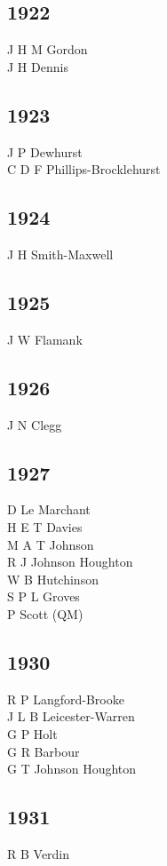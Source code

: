 \begin{multicols}{3}
  \subsection*{1922}
  J H M Gordon \\
  J H Dennis \\
  \subsection*{1923}
  J P Dewhurst \\
  C D F Phillips-Brocklehurst \\
  \subsection*{1924}
  J H Smith-Maxwell \\
  \subsection*{1925}
  J W Flamank \\
  \subsection*{1926}
  J N Clegg \\
  \subsection*{1927}
  D Le Marchant \\
  H E T Davies \\
  M A T Johnson \\
  R J Johnson Houghton \\
  W B Hutchinson \\
  S P L Groves \\
  P Scott (QM) \\
  \subsection*{1930}
  R P Langford-Brooke \\
  J L B Leicester-Warren \\
  G P Holt \\
  G R Barbour \\
  G T Johnson Houghton \\
  \subsection*{1931}
  R B Verdin \\

\end{multicols}
